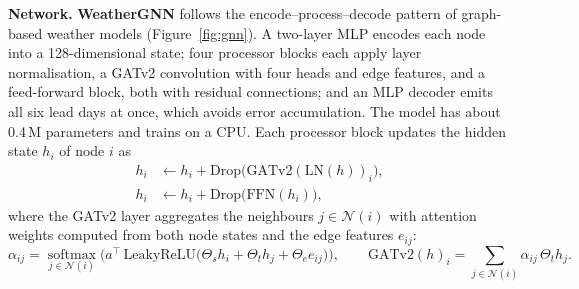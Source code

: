 \textbf{Network.} \textbf{WeatherGNN} follows the encode--process--decode pattern of graph-based weather models (Figure~\ref{fig:gnn}). A two-layer MLP encodes each node into a 128-dimensional state; four processor blocks each apply layer normalisation, a GATv2 convolution \cite{ref13} with four heads and edge features, and a feed-forward block, both with residual connections; and an MLP decoder emits all six lead days at once, which avoids error accumulation. The model has about 0.4\,M parameters and trains on a CPU. Each processor block updates the hidden state $h_i$ of node $i$ as
\begin{align}
h_i &\leftarrow h_i + \mathrm{Drop}\big(\mathrm{GATv2}(\mathrm{LN}(h))_i\big), \label{eq:block1}\\
h_i &\leftarrow h_i + \mathrm{Drop}\big(\mathrm{FFN}(h_i)\big), \label{eq:block2}
\end{align}
where the GATv2 layer \cite{ref13} aggregates the neighbours $j\in\mathcal{N}(i)$ with attention weights computed from both node states and the edge features $e_{ij}$:
\begin{equation}
\alpha_{ij}=\operatorname*{softmax}_{j\in\mathcal{N}(i)}\Big(a^{\top}\,\mathrm{LeakyReLU}\big(\Theta_s h_i+\Theta_t h_j+\Theta_e e_{ij}\big)\Big), \qquad
\mathrm{GATv2}(h)_i=\sum_{j\in\mathcal{N}(i)}\alpha_{ij}\,\Theta_t h_j .
\label{eq:gat}
\end{equation}

